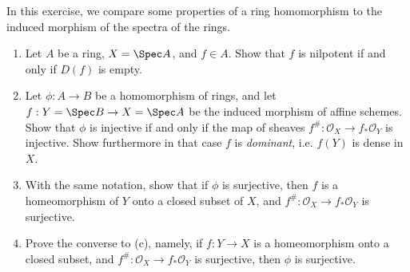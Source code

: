 \begin{exercise}%
	In this exercise, we compare some properties of a ring homomorphism to the induced morphism of the spectra of the rings.
	\begin{enumerate}
		\item Let $A $ be a ring, $X  = \Spec A$, and $f \in A $. Show that $f $ is nilpotent if and only if $D(f) $ is empty.
		\item Let $\phi :A\to B $ be a homomorphism of rings, and let $f: Y = \Spec B \to X = \Spec A $ be the induced morphism of affine schemes. Show that $\phi  $ is injective if and only if the map of sheaves $f^\#: \mathcal{O}_X \to f_\ast \mathcal{O}_Y $ is injective. Show furthermore in that case $f $ is \textit{dominant}, i.e. $f(Y) $ is dense in $X $.
		\item With the same notation, show that if $\phi  $ is surjective, then $f $ is a homeomorphism of $Y $ onto a closed subset of $X $, and $f^\#: \mathcal{O}_X\to f_\ast \mathcal{O}_Y$ is surjective.
		\item Prove the converse to (c), namely, if $f: Y\to X $ is a homeomorphism onto a closed subset, and $f^\#: \mathcal{O}_X\to f_\ast \mathcal{O}_Y $ is surjective, then $\phi  $ is surjective.

	\end{enumerate}
\end{exercise}
